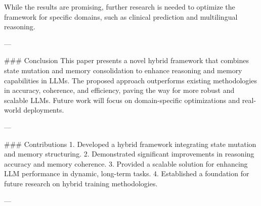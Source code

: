 While the results are promising, further research is needed to optimize the framework for specific domains, such as clinical prediction and multilingual reasoning.

---

### Conclusion  
This paper presents a novel hybrid framework that combines state mutation and memory consolidation to enhance reasoning and memory capabilities in LLMs. The proposed approach outperforms existing methodologies in accuracy, coherence, and efficiency, paving the way for more robust and scalable LLMs. Future work will focus on domain-specific optimizations and real-world deployments.

---

### Contributions  
1. Developed a hybrid framework integrating state mutation and memory structuring.  
2. Demonstrated significant improvements in reasoning accuracy and memory coherence.  
3. Provided a scalable solution for enhancing LLM performance in dynamic, long-term tasks.  
4. Established a foundation for future research on hybrid training methodologies.  

---
